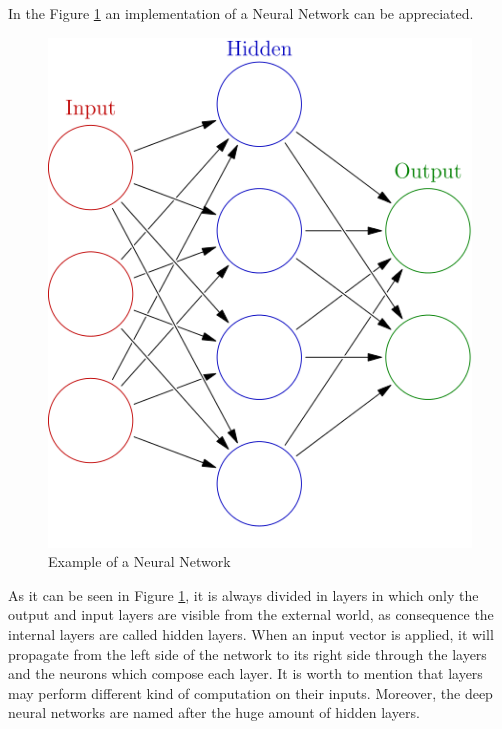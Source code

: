 In the Figure \ref{fig:nn} an implementation of a Neural Network can be appreciated.
\begin{figure}[H]
\centering
\captionsetup{justification=centering}
\includegraphics[scale=0.4]{./figure/neural_network.PNG}
\caption{Example of a Neural Network\cite{WEBSITE:10}}
\label{fig:nn}
\end{figure}
As it can be seen in Figure \ref{fig:nn}, it is always divided in layers in which only the output and input layers are visible from the external world, as consequence the internal layers are called hidden layers. When an input vector is applied, it will propagate from the left side of the network to its right side through the layers and the neurons which compose each layer. It is worth to mention that layers may perform different kind of computation on their inputs. Moreover, the deep neural networks are named after the huge amount of hidden layers.\\\\

